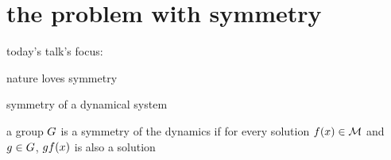 \section[Das Problem]{the problem with symmetry}


\begin{frame}{}
today's talk's focus:
\begin{block}{}
{\Huge
nature loves symmetry
}
\end{block}
\end{frame}

\begin{frame}{symmetry of a dynamical system}
\begin{block}{a group $G$ is a {symmetry} of the dynamics if}
for every solution $f(x) \in {\cal M}$ and  $g \in G$,
$g f(x)$ is also a solution
\end{block}
\end{frame}


